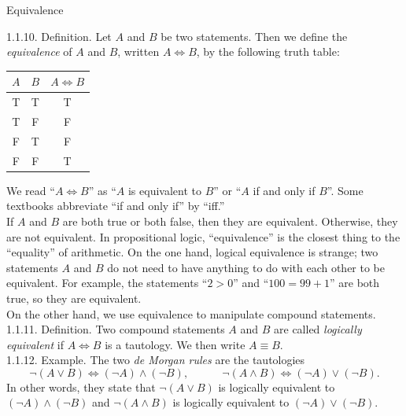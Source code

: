 \documentclass[smaller,hyperref={CJKbookmarks=true}]{beamer}
\begin{document}
\begin{frame}{Equivalence}
\begin{spacing}{1.1}
\vspace*{10pt}
\alert{1.1.10. Definition.} Let $A$ and $B$ be two statements. Then we define the \emph{equivalence} of $A$ and $B$, written $A\Leftrightarrow B$, by the following truth table:
\begin{center}
\begin{tabular}{c|c|c}
  $A$ & $B$ & $A\Leftrightarrow B$ \\ \hline
  T & T & T \\
  T & F & F \\
  F & T & F \\
  F & F & T
\end{tabular}
\end{center}
We read ``$A\Leftrightarrow B$'' as ``$A$ is equivalent to $B$'' or ``$A$ if and only if $B$''. Some textbooks abbreviate ``if and only if'' by ``if{}f.''\\[5pt]
If $A$ and $B$ are both true or both false, then they are equivalent. Otherwise, they are not equivalent. In propositional logic, ``equivalence'' is the closest thing to the ``equality'' of arithmetic.
\newpage
On the one hand, logical equivalence is strange; two statements $A$ and $B$
do not need to have anything to do with each other to be equivalent. For
example, the statements ``$2>0$'' and ``$100=99+1$'' are both true, so they are equivalent.\\[5pt]
On the other hand, we use equivalence to manipulate compound
statements.\\[8pt]
\alert{1.1.11. Definition.} Two compound statements $A$ and $B$ are called \emph{logically equivalent} if $A\Leftrightarrow B$ is a tautology. We then write $A\equiv B$.\\[8pt]
\alert{1.1.12. Example.} The two \emph{de Morgan rules} are the tautologies
\[\neg(A\vee B)\Leftrightarrow(\neg A)\wedge(\neg B),\qquad\quad\neg(A\wedge B)\Leftrightarrow(\neg A)\vee(\neg B).\]
In other words, they state that $\neg(A\vee B)$ is logically equivalent to $(\neg A)\wedge(\neg B)$ and $\neg(A\wedge B)$ is logically equivalent to $(\neg A)\vee(\neg B)$.
\end{spacing}
\end{frame}
\end{document}
